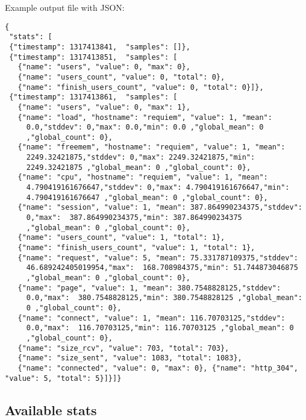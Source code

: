 \documentclass{TSUNG-en}
\begin{document}
Example output file with JSON:
\begin{Verbatim}
{
 "stats": [
 {"timestamp": 1317413841,  "samples": []},
 {"timestamp": 1317413851,  "samples": [
   {"name": "users", "value": 0, "max": 0},
   {"name": "users_count", "value": 0, "total": 0},
   {"name": "finish_users_count", "value": 0, "total": 0}]},
 {"timestamp": 1317413861,  "samples": [
   {"name": "users", "value": 0, "max": 1},
   {"name": "load", "hostname": "requiem", "value": 1, "mean":
     0.0,"stddev": 0,"max": 0.0,"min": 0.0 ,"global_mean": 0
     ,"global_count": 0},
   {"name": "freemem", "hostname": "requiem", "value": 1, "mean":
     2249.32421875,"stddev": 0,"max": 2249.32421875,"min":
     2249.32421875 ,"global_mean": 0 ,"global_count": 0},
   {"name": "cpu", "hostname": "requiem", "value": 1, "mean":
     4.790419161676647,"stddev": 0,"max": 4.790419161676647,"min":
     4.790419161676647 ,"global_mean": 0 ,"global_count": 0},
   {"name": "session", "value": 1, "mean": 387.864990234375,"stddev":
     0,"max":  387.864990234375,"min": 387.864990234375
     ,"global_mean": 0 ,"global_count": 0},
   {"name": "users_count", "value": 1, "total": 1},
   {"name": "finish_users_count", "value": 1, "total": 1},
   {"name": "request", "value": 5, "mean": 75.331787109375,"stddev":
     46.689242405019954,"max":  168.708984375,"min": 51.744873046875
     ,"global_mean": 0 ,"global_count": 0},
   {"name": "page", "value": 1, "mean": 380.7548828125,"stddev":
     0.0,"max":  380.7548828125,"min": 380.7548828125 ,"global_mean":
     0 ,"global_count": 0},
   {"name": "connect", "value": 1, "mean": 116.70703125,"stddev":
     0.0,"max":  116.70703125,"min": 116.70703125 ,"global_mean": 0
     ,"global_count": 0},
   {"name": "size_rcv", "value": 703, "total": 703},
   {"name": "size_sent", "value": 1083, "total": 1083},
   {"name": "connected", "value": 0, "max": 0}, {"name": "http_304", "value": 5, "total": 5}]}]}
\end{Verbatim}

\subsection{Available stats}
\end{document}
